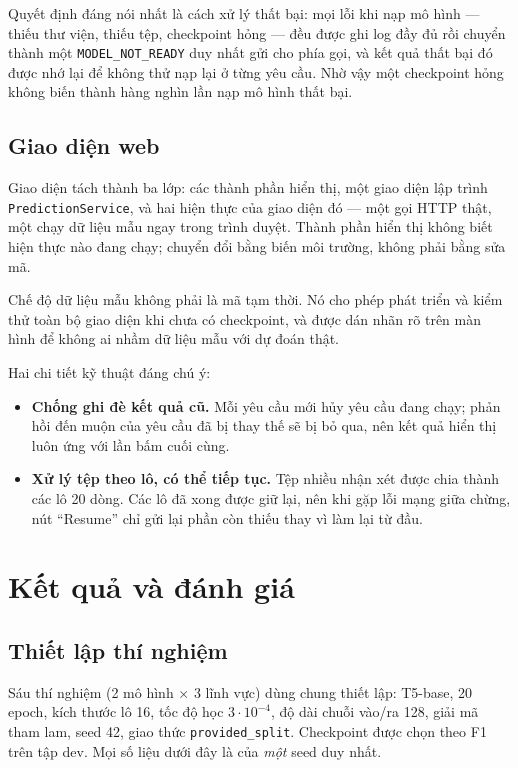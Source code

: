 \documentclass[12pt,a4paper]{report}
\newcommand{\enquote}[1]{“#1”}
\newcommand{\code}[1]{\texttt{#1}}
\begin{document}
Quyết định đáng nói nhất là cách xử lý thất bại: mọi lỗi khi nạp mô hình --- thiếu thư viện, thiếu tệp, checkpoint hỏng
--- đều được ghi log đầy đủ rồi chuyển thành một \code{MODEL\_NOT\_READY} duy nhất gửi cho phía gọi, và kết quả thất bại
đó được nhớ lại để không thử nạp lại ở từng yêu cầu. Nhờ vậy một checkpoint hỏng không biến thành hàng nghìn lần nạp mô
hình thất bại.

\section{Giao diện web}

Giao diện tách thành ba lớp: các thành phần hiển thị, một giao diện lập trình \code{PredictionService}, và hai hiện thực
của giao diện đó --- một gọi HTTP thật, một chạy dữ liệu mẫu ngay trong trình duyệt. Thành phần hiển thị không biết hiện
thực nào đang chạy; chuyển đổi bằng biến môi trường, không phải bằng sửa mã.

Chế độ dữ liệu mẫu không phải là mã tạm thời. Nó cho phép phát triển và kiểm thử toàn bộ giao diện khi chưa có
checkpoint, và được dán nhãn rõ trên màn hình để không ai nhầm dữ liệu mẫu với dự đoán thật.

Hai chi tiết kỹ thuật đáng chú ý:

\begin{itemize}
  \item \textbf{Chống ghi đè kết quả cũ.} Mỗi yêu cầu mới hủy yêu cầu đang chạy; phản hồi đến muộn của yêu cầu đã bị
        thay thế sẽ bị bỏ qua, nên kết quả hiển thị luôn ứng với lần bấm cuối cùng.
  \item \textbf{Xử lý tệp theo lô, có thể tiếp tục.} Tệp nhiều nhận xét được chia thành các lô 20 dòng. Các lô đã xong
        được giữ lại, nên khi gặp lỗi mạng giữa chừng, nút \enquote{Resume} chỉ gửi lại phần còn thiếu thay vì làm lại
        từ đầu.
\end{itemize}

\chapter{Kết quả và đánh giá}
\label{chap:ketqua}

\section{Thiết lập thí nghiệm}

Sáu thí nghiệm (2 mô hình $\times$ 3 lĩnh vực) dùng chung thiết lập: T5-base, 20 epoch, kích thước lô 16, tốc độ học
$3\cdot10^{-4}$, độ dài chuỗi vào/ra 128, giải mã tham lam, seed 42, giao thức \code{provided\_split}. Checkpoint được
chọn theo F1 trên tập dev. Mọi số liệu dưới đây là của \emph{một} seed duy nhất.
\end{document}
